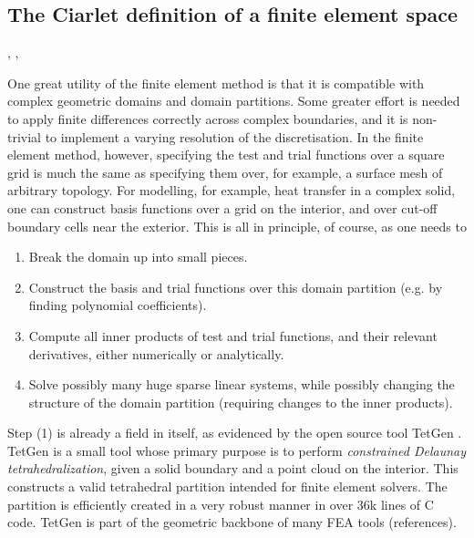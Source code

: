 \subsection{The Ciarlet definition of a finite element space}
\cite{ciarlet}, \cite{ham_fem}, \cite{fenics_book}



One great utility of the finite element method is that it is compatible with complex geometric domains and domain partitions.
Some greater effort is needed to apply finite differences correctly across complex boundaries, and it is non-trivial to implement
a varying resolution of the discretisation. In the finite element method, however, specifying the test and trial functions over
a square grid is much the same as specifying them over, for example, a surface mesh of arbitrary topology. For modelling, for example,
heat transfer in a complex solid, one can construct basis functions over a grid on the interior, and over cut-off boundary cells near the exterior.
This is all in principle, of course, as one needs to
\begin{enumerate}
    \item Break the domain up into small pieces.
    \item Construct the basis and trial functions over this domain partition (e.g. by finding polynomial coefficients).
    \item Compute all inner products of test and trial functions, and their relevant derivatives, either numerically or analytically.
    \item Solve possibly many huge sparse linear systems, while possibly changing the structure of the domain partition (requiring changes to the inner products).
\end{enumerate}

Step (1) is already a field in itself, as evidenced by the open source tool TetGen \cite{tetgen}.
TetGen is a small tool whose primary purpose is to perform \textit{constrained Delaunay tetrahedralization}, given a solid boundary and a point cloud on the interior.
This constructs a valid tetrahedral partition intended for finite element solvers. The partition is efficiently created in a very robust manner in over 36k lines of C code. TetGen is part of the geometric backbone of many FEA tools (references).
